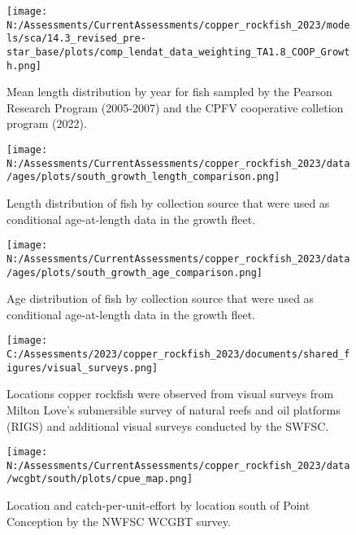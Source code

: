 \documentclass[11pt,
  english,
  letterpaper,
]{article}
\begin{document}
\pagebreak

\begin{figure}
\centering
\texttt{[image: N:/Assessments/CurrentAssessments/copper\_rockfish\_2023/models/sca/14.3\_revised\_pre-star\_base/plots/comp\_lendat\_data\_weighting\_TA1.8\_COOP\_Growth.png]}
\caption{Mean length distribution by year for fish sampled by the Pearson Research Program (2005-2007) and the CPFV cooperative colletion program (2022).\label{fig:growth-mean-coop-len}}
\end{figure}

\pagebreak

\begin{figure}
\centering
\texttt{[image: N:/Assessments/CurrentAssessments/copper\_rockfish\_2023/data/ages/plots/south\_growth\_length\_comparison.png]}
\caption{Length distribution of fish by collection source that were used as conditional age-at-length data in the growth fleet.\label{fig:growth-len-dist}}
\end{figure}

\pagebreak

\begin{figure}
\centering
\texttt{[image: N:/Assessments/CurrentAssessments/copper\_rockfish\_2023/data/ages/plots/south\_growth\_age\_comparison.png]}
\caption{Age distribution of fish by collection source that were used as conditional age-at-length data in the growth fleet.\label{fig:growth-age-dist}}
\end{figure}

\pagebreak

\begin{figure}
\centering
\texttt{[image: C:/Assessments/2023/copper\_rockfish\_2023/documents/shared\_figures/visual\_surveys.png]}
\caption{Locations copper rockfish were observed from visual surveys from Milton Love's submersible survey of natural reefs and oil platforms (RIGS) and additional visual surveys conducted by the SWFSC.\label{fig:visual-surveys}}
\end{figure}

\begin{figure}
\centering
\texttt{[image: N:/Assessments/CurrentAssessments/copper\_rockfish\_2023/data/wcgbt/south/plots/cpue\_map.png]}
\caption{Location and catch-per-unit-effort by location south of Point Conception by the NWFSC WCGBT survey.\label{fig:wcgbt-cpue}}
\end{figure}
\end{document}
